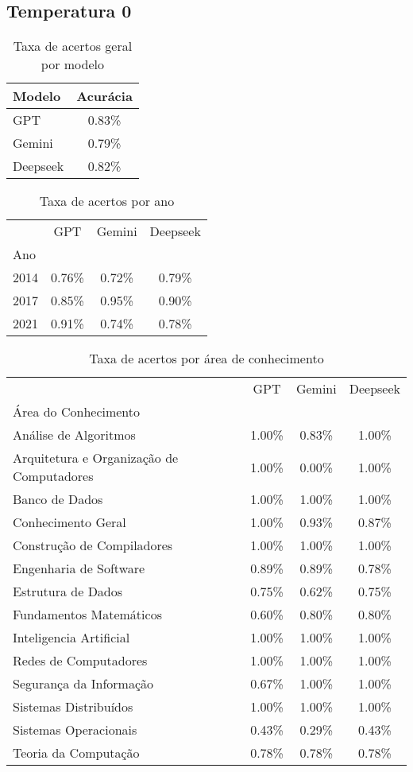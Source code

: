 \subsection{Temperatura 0}

\begin{table}[H]
\centering
\caption{Taxa de acertos geral por modelo}
\label{tab:acuracia_geral}
\begin{tabular}{l c}
\toprule
Modelo & Acurácia \\
\midrule
GPT & 0.83\% \\
Gemini & 0.79\% \\
Deepseek & 0.82\% \\
\bottomrule
\end{tabular}
\end{table}


\begin{table}[H]
\centering
\caption{Taxa de acertos por ano}
\label{tab:acuracia_ano}
\begin{tabular}{l c c c}
\toprule
 & GPT & Gemini & Deepseek \\
Ano &  &  &  \\
\midrule
2014 & 0.76\% & 0.72\% & 0.79\% \\
2017 & 0.85\% & 0.95\% & 0.90\% \\
2021 & 0.91\% & 0.74\% & 0.78\% \\
\bottomrule
\end{tabular}
\end{table}


\begin{table}[H]
\centering
\caption{Taxa de acertos por área de conhecimento}
\label{tab:acuracia_area}
\begin{tabular}{l c c c}
\toprule
 & GPT & Gemini & Deepseek \\
Área do Conhecimento &  &  &  \\
\midrule
Análise de Algoritmos & 1.00\% & 0.83\% & 1.00\% \\
Arquitetura e Organização de Computadores & 1.00\% & 0.00\% & 1.00\% \\
Banco de Dados & 1.00\% & 1.00\% & 1.00\% \\
Conhecimento Geral & 1.00\% & 0.93\% & 0.87\% \\
Construção de Compiladores & 1.00\% & 1.00\% & 1.00\% \\
Engenharia de Software & 0.89\% & 0.89\% & 0.78\% \\
Estrutura de Dados & 0.75\% & 0.62\% & 0.75\% \\
Fundamentos Matemáticos & 0.60\% & 0.80\% & 0.80\% \\
Inteligencia Artificial & 1.00\% & 1.00\% & 1.00\% \\
Redes de Computadores & 1.00\% & 1.00\% & 1.00\% \\
Segurança da Informação & 0.67\% & 1.00\% & 1.00\% \\
Sistemas Distribuídos & 1.00\% & 1.00\% & 1.00\% \\
Sistemas Operacionais & 0.43\% & 0.29\% & 0.43\% \\
Teoria da Computação & 0.78\% & 0.78\% & 0.78\% \\
\bottomrule
\end{tabular}
\end{table}
